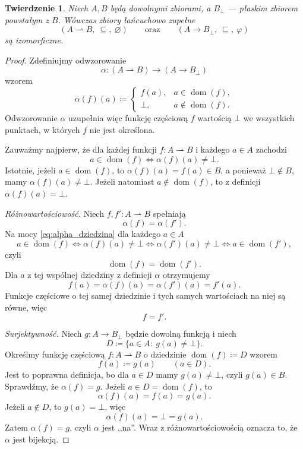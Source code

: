 \documentclass[11pt,a4paper]{article}
\theoremstyle{definition}
\theoremstyle{plain}
\newtheorem{twierdzenie}[definicja]{Twierdzenie}
\newcommand{\bt}{\bot}                            %
\newcommand{\dom}{\operatorname{dom}}
\begin{document}
\begin{twierdzenie}\label{tw:izomorfizm_czesciowe_calkowite}
	Niech $A,B$ będą dowolnymi zbiorami, a $B_\bt$ --- płaskim zbiorem
	powstałym z $B$. Wówczas zbiory łańcuchowo
	zupełne
	\[
	(A\rightharpoonup B,\ \subseteq,\ \varnothing)
	\qquad\text{oraz}\qquad
	(A\to B_\bt,\ \sqsubseteq,\ \varphi)
	\]
	są izomorficzne.
\end{twierdzenie}

\begin{proof}
	Zdefiniujmy odwzorowanie
	\[
	\alpha:(A\rightharpoonup B)\longrightarrow(A\to B_\bt)
	\]
	wzorem
	\[
	\alpha(f)(a)\coloneqq
	\begin{cases}
		f(a),&a\in\dom(f),\\
		\bt,&a\notin\dom(f).
	\end{cases}
	\]
	Odwzorowanie $\alpha$ uzupełnia więc funkcję częściową $f$ wartością
	$\bt$ we wszystkich punktach, w których $f$ nie jest określona.
	
	Zauważmy najpierw, że dla każdej funkcji $f:A\rightharpoonup B$ i każdego
	$a\in A$ zachodzi
	\begin{equation}\label{eq:alpha_dziedzina}
		a\in\dom(f)
		\iff
		\alpha(f)(a)\neq\bt.
	\end{equation}
	Istotnie, jeżeli $a\in\dom(f)$, to $\alpha(f)(a)=f(a)\in B$, a ponieważ
	$\bt\notin B$, mamy $\alpha(f)(a)\neq\bt$. Jeżeli natomiast
	$a\notin\dom(f)$, to z definicji $\alpha(f)(a)=\bt$.
	
	\emph{Różnowartościowość.} Niech $f,f':A\rightharpoonup B$ spełniają
	\[
	\alpha(f)=\alpha(f').
	\]
	Na mocy \eqref{eq:alpha_dziedzina} dla każdego $a\in A$
	\[
	a\in\dom(f)
	\iff
	\alpha(f)(a)\neq\bt
	\iff
	\alpha(f')(a)\neq\bt
	\iff
	a\in\dom(f'),
	\]
	czyli
	\[
	\dom(f)=\dom(f').
	\]
	Dla $a$ z tej wspólnej dziedziny z definicji $\alpha$ otrzymujemy
	\[
	f(a)=\alpha(f)(a)=\alpha(f')(a)=f'(a).
	\]
	Funkcje częściowe o tej samej dziedzinie i tych samych wartościach na
	niej są równe, więc
	\[
	f=f'.
	\]
	
	\emph{Surjektywność.} Niech $g:A\to B_\bt$ będzie dowolną funkcją
	i niech
	\[
	D\coloneqq\{a\in A:\ g(a)\neq\bt\}.
	\]
	Określmy funkcję częściową $f:A\rightharpoonup B$ o dziedzinie
	$\dom(f)\coloneqq D$ wzorem
	\[
	f(a)\coloneqq g(a)
	\qquad(a\in D).
	\]
	Jest to poprawna definicja, bo dla $a\in D$ mamy $g(a)\neq\bt$, czyli
	$g(a)\in B$. Sprawdźmy, że $\alpha(f)=g$. Jeżeli $a\in D=\dom(f)$, to
	\[
	\alpha(f)(a)=f(a)=g(a).
	\]
	Jeżeli $a\notin D$, to $g(a)=\bt$, więc
	\[
	\alpha(f)(a)=\bt=g(a).
	\]
	Zatem $\alpha(f)=g$, czyli $\alpha$ jest ,,na''. Wraz z
	różnowartościowością oznacza to, że $\alpha$ jest bijekcją.
	

\end{proof}
\end{document}
